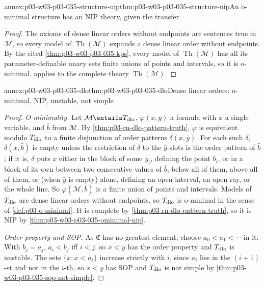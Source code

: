 \begin{annexitem}{annex:p03-w03-p03-035-structure-nip}{thm:p03-w03-p03-035-structure-nip}{An o-minimal structure has an NIP theory, given the transfer}
\begin{proof}
The axioms of dense linear orders without endpoints are sentences true in
\(\mathcal M\), so every model of \(\operatorname{Th}(\mathcal M)\) expands a
dense linear order without endpoints.  By the cited
\cref{thm:p03-w03-p03-035-kps}, every model of
\(\operatorname{Th}(\mathcal M)\) has all its parameter-definable unary sets
finite unions of points and intervals, so it is o-minimal.
 applies to the complete theory
\(\operatorname{Th}(\mathcal M)\).
\end{proof}
\end{annexitem}

\begin{annexitem}{annex:p03-w03-p03-035-dlo}{thm:p03-w03-p03-035-dlo}{Dense linear orders: o-minimal, NIP, unstable, not simple}
\begin{proof}
\emph{O-minimality.}  Let \(\mathcal M\entails T_{\rm dlo}\), \(\varphi(x,\bar
y)\) a formula with \(x\) a single variable, and \(\bar b\) from
\(\mathcal M\).  By \cref{thm:p03-rn-dlo-pattern-truth}, \(\varphi\) is
equivalent modulo \(T_{\rm dlo}\) to a finite disjunction of order patterns
\(\delta(x,\bar y)\).  For each such \(\delta\), \(\delta(x,\bar b)\) is
empty unless the restriction of \(\delta\) to the \(\bar y\)-slots is the
order pattern of \(\bar b\); if it is, \(\delta\) puts \(x\) either in the
block of some \(y_i\), defining the point \(b_i\), or in a block of its own
between two consecutive values of \(\bar b\), below all of them, above all of
them, or (when \(\bar y\) is empty) alone, defining an open interval, an open
ray, or the whole line.  So \(\varphi(\mathcal M,\bar b)\) is a finite union
of points and intervals.  Models of \(T_{\rm dlo}\) are dense linear orders
without endpoints, so \(T_{\rm dlo}\) is o-minimal in the sense of
\cref{def:p03-o-minimal}.  It is complete by
\cref{thm:p03-rn-dlo-pattern-truth}, so it is NIP by
\cref{thm:p03-w03-p03-035-ominimal-nip}.

\emph{Order property and SOP.}  As \(\mathfrak C\) has no greatest element,
choose \(a_0<a_1<\cdots\) in it.  With \(b_j=a_j\), \(a_i<b_j\) iff \(i<j\), so
\(x<y\) has the order property and \(T_{\rm dlo}\) is unstable.  The sets
\(\{x:x<a_i\}\) increase strictly with \(i\), since \(a_i\) lies in the
\((i+1)\)-st and not in the \(i\)-th, so \(x<y\) has SOP and \(T_{\rm dlo}\) is
not simple by \cref{thm:p03-w03-p03-035-sop-not-simple}.
\end{proof}
\end{annexitem}

